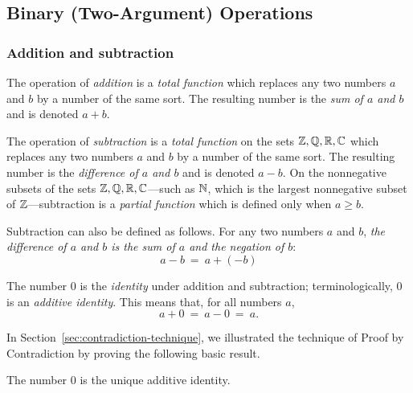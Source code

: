 \subsection{Binary (Two-Argument) Operations}
\label{sec:binary-operators}

\subsubsection{Addition and subtraction}
 

The operation of {\it addition} is a {\em total function} which replaces any two numbers $a$ and $b$ by a number of the same sort.  The resulting number is the {\em sum of $a$ and $b$} and is denoted $a+b$.

\smallskip

 
\noindent
The operation of {\it subtraction} is a {\em total function} on the sets $\mathbb{Z}, \mathbb{Q}, \mathbb{R}, \mathbb{C}$ which replaces any two numbers $a$ and $b$ by a number of the same sort.  The resulting number is the {\em difference of $a$ and $b$} and is denoted $a-b$.  On the nonnegative subsets of the sets $\mathbb{Z}, \mathbb{Q}, \mathbb{R}, \mathbb{C}$---such as $\mathbb{N}$, which is the largest nonnegative subset of $\mathbb{Z}$---subtraction is a {\em partial function} which is defined only when $a \geq b$.

\smallskip

Subtraction can also be defined as follows.  For any two numbers $a$ and $b$, {\em the difference of $a$ and $b$ is the sum of $a$ and the negation of $b$}:
\[ a-b \ = \ a + (-b) \]

\medskip


The number $0$ is the {\it identity} under addition and subtraction; terminologically, $0$ is an {\it additive identity}.  This means that, for all numbers $a$,
\[ a+0 \ = \ a-0 \ = \ a. \]

In Section~\ref{sec:contradiction-technique}, we illustrated the technique of Proof by Contradiction by proving the following basic result.

\begin{prop}
\label{thm:unique-add-iden}
The number $0$ is the unique additive identity.
\end{prop}


